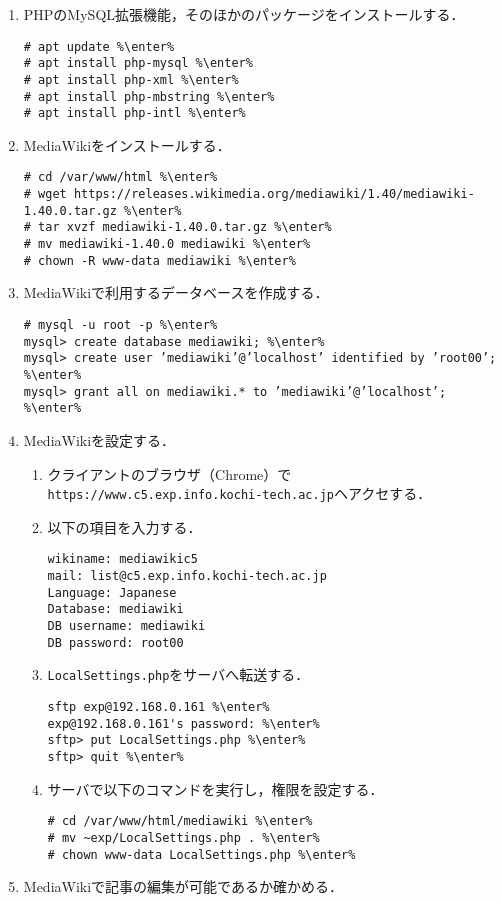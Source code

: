\documentclass{jlreq}
\begin{document}
\begin{enumerate}
    \item PHPのMySQL拡張機能，そのほかのパッケージをインストールする．
          \begin{lstlisting}
# apt update %\enter%        
# apt install php-mysql %\enter%
# apt install php-xml %\enter%
# apt install php-mbstring %\enter%
# apt install php-intl %\enter%
    \end{lstlisting}
    \item MediaWikiをインストールする．
          \begin{lstlisting}
# cd /var/www/html %\enter%
# wget https://releases.wikimedia.org/mediawiki/1.40/mediawiki-1.40.0.tar.gz %\enter%
# tar xvzf mediawiki-1.40.0.tar.gz %\enter%
# mv mediawiki-1.40.0 mediawiki %\enter%
# chown -R www-data mediawiki %\enter%
\end{lstlisting}
    \item MediaWikiで利用するデータベースを作成する．
          \begin{lstlisting}
# mysql -u root -p %\enter%
mysql> create database mediawiki; %\enter%
mysql> create user ’mediawiki’@’localhost’ identified by ’root00’; %\enter%
mysql> grant all on mediawiki.* to ’mediawiki’@’localhost’; %\enter%
\end{lstlisting}
    \item MediaWikiを設定する．
          \begin{enumerate}
              \item クライアントのブラウザ（Chrome）で\texttt{https://www.c5.exp.info.kochi-tech.ac.jp}ヘアクセする．
              \item 以下の項目を入力する．
                    \begin{lstlisting}
wikiname: mediawikic5
mail: list@c5.exp.info.kochi-tech.ac.jp
Language: Japanese
Database: mediawiki
DB username: mediawiki
DB password: root00
                \end{lstlisting}
              \item \texttt{LocalSettings.php}をサーバへ転送する．
                    \begin{lstlisting}[caption={Windows のクライアントて実行}]
sftp exp@192.168.0.161 %\enter%
exp@192.168.0.161's password: %\enter%
sftp> put LocalSettings.php %\enter%
sftp> quit %\enter%
\end{lstlisting}
              \item サーバで以下のコマンドを実行し，権限を設定する．
                    \begin{lstlisting}
# cd /var/www/html/mediawiki %\enter%
# mv ~exp/LocalSettings.php . %\enter%
# chown www-data LocalSettings.php %\enter%
\end{lstlisting}
          \end{enumerate}
    \item MediaWikiで記事の編集が可能であるか確かめる．
\end{enumerate}
\end{document}
